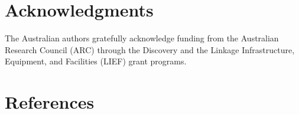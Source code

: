 \documentclass[review,3p,times]{elsarticle}
\begin{document}
\section*{Acknowledgments}

The Australian authors gratefully acknowledge funding from the Australian Research Council (ARC) through the Discovery and the Linkage Infrastructure, Equipment, and Facilities (LIEF) grant programs.


\section*{References}



\renewcommand{\thefigure}{\arabic{figure}}
\renewcommand{\thetable}{\arabic{table}}
\end{document}
